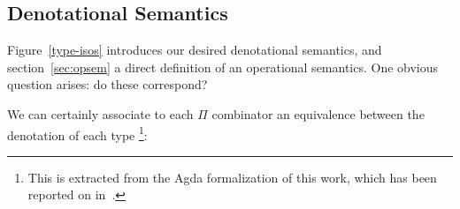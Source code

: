\documentclass{article}
\newtheorem{definition}[theorem]{Definition}
\newcommand{\idc}{\mathit{id}\!\!\leftrightarrow}
\begin{document}



\subsection{Denotational Semantics}

Figure~\ref{type-isos} introduces our desired denotational
semantics, and section~\ref{sec:opsem} a direct definition
of an operational semantics. One obvious question arises:
do these correspond? 

We can certainly associate to each $\Pi$ combinator an
equivalence between the denotation of each type%
\footnote{This is extracted from the Agda formalization
of this work, which has been reported on in~\cite{Carette2016}.}:
\begin{code}\hspace*{-4mm}
\> \AgdaSymbol{:} \AgdaSymbol{\{}
 \AgdaSymbol{:} \AgdaSymbol{\}} 
\AgdaSymbol{(} \AgdaSymbol{:}  
\AgdaSymbol{)}   
   
%
\end{code}
\end{document}
